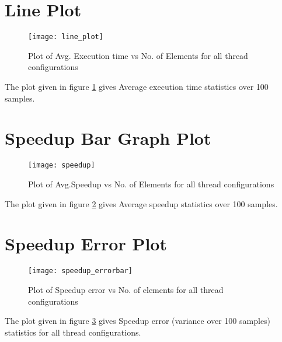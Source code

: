 \documentclass{article}
\begin{document}
\section{Line Plot}

\begin{figure}[h]
    \centering
    \texttt{[image: line\_plot]}
    \caption{Plot of Avg. Execution time vs No. of Elements for all thread configurations }
    \label{fig:line_plot}
\end{figure}

The plot given in figure \ref{fig:line_plot} gives Average execution time statistics over 100 samples.

\section{Speedup Bar Graph Plot}

\begin{figure}[h]
    \centering
    \texttt{[image: speedup]}
    \caption{Plot of Avg.Speedup vs No. of Elements for all thread configurations  }
    \label{fig:speedup_plot}
\end{figure}

The plot given in figure \ref{fig:speedup_plot} gives Average speedup statistics over 100 samples.

\section{Speedup Error Plot}

\begin{figure}[h]
    \centering
    \texttt{[image: speedup\_errorbar]}
    \caption{Plot of Speedup error vs No. of elements for all thread configurations }
    \label{fig:speedup_error}
\end{figure}

The plot given in figure \ref{fig:speedup_error} gives Speedup error (variance over 100 samples) statistics for all thread configurations.
\end{document}
